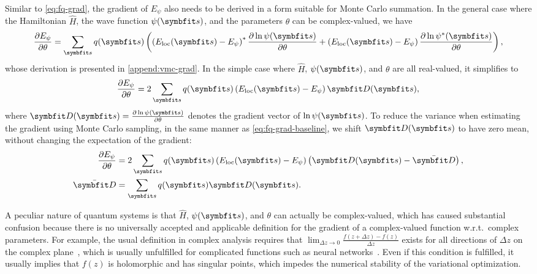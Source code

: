 Similar to \cref{eq:fq-grad}, the gradient of $E_\psi$ also needs to be derived in a form suitable for Monte Carlo summation. In the general case where the Hamiltonian $\hat{H}$, the wave function $\psi(\vs)$, and the parameters $\theta$ can be complex-valued, we have
\begin{equation}
\frac{\partial E_\psi}{\partial \theta} = \sum_\vs q(\vs) \left( \left( E_\text{loc}(\vs) - E_\psi \right)^* \frac{\partial \ln \psi(\vs)}{\partial \theta} + \left( E_\text{loc}(\vs) - E_\psi \right) \frac{\partial \ln \psi^*(\vs)}{\partial \theta} \right), \label{eq:vmc-grad-cmpl}
\end{equation}
whose derivation is presented in \cref{append:vmc-grad}. In the simple case where $\hat{H}$, $\psi(\vs)$, and $\theta$ are all real-valued, it simplifies to
\begin{equation}
\frac{\partial E_\psi}{\partial \theta} = 2 \sum_\vs q(\vs) \left( E_\text{loc}(\vs) - E_\psi \right) \vD(\vs),
\label{eq:vmc-grad-real}
\end{equation}
where $\vD(\vs) = \frac{\partial \ln \psi(\vs)}{\partial \theta}$ denotes the gradient vector of $\ln \psi(\vs)$. To reduce the variance when estimating the gradient using Monte Carlo sampling, in the same manner as \cref{eq:fq-grad-baseline}, we shift $\vD(\vs)$ to have zero mean, without changing the expectation of the gradient:
\begin{align}
\frac{\partial E_\psi}{\partial \theta} &= 2 \sum_\vs q(\vs) \left( E_\text{loc}(\vs) - E_\psi \right) \left( \vD(\vs) - \bar{\vD} \right), \label{eq:vmc-grad-baseline} \\
\bar{\vD} &= \sum_\vs q(\vs) \vD(\vs).
\end{align}

A peculiar nature of quantum systems is that $\hat{H}$, $\psi(\vs)$, and $\theta$ can actually be complex-valued, which has caused substantial confusion because there is no universally accepted and applicable definition for the gradient of a complex-valued function w.r.t.\ complex parameters. For example, the usual definition in complex analysis requires that $\lim_{\Delta z \to 0} \frac{f(z + \Delta z) - f(z)}{\Delta z}$ exists for all directions of $\Delta z$ on the complex plane~\cite{rudin1986real}, which is usually unfulfilled for complicated functions such as neural networks~\cite{bassey2021survey}. Even if this condition is fulfilled, it usually implies that $f(z)$ is holomorphic and has singular points, which impedes the numerical stability of the variational optimization.


